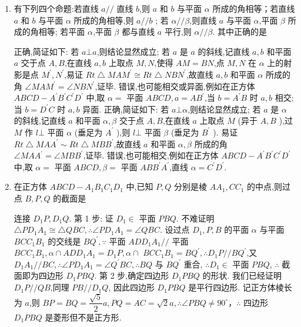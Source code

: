 \begin{enumerate}
    \item 有下列四个命题:若直线 $a//$ 直线 $b$,则 $a$ 和 $b$ 与平面 $\alpha$ 所成的角相等；若直线 $a$ 和 $b$ 与平面 $\alpha$ 所成的角相等,则 $a//b$ ; 若 $\alpha //\beta$,则直线 $a$ 与平面 $\alpha$,平面 $\beta$ 所成的角相等; 若平面 $\alpha$,平面 $\beta$ 都与直线 $a$ 平行,则 $\alpha //\beta$. 其中正确的是
    \begin{jieda}
        正确,简证如下: 若 $a\bot a$,则结论显然成立; 若 $a$ 是 $a$ 的斜线,记直线 $a,b$ 和平面 $a$ 交于点 $A,B$,在直线 $a,b$ 上取点 $M,N$,使得 ${AM} = {BN}$,点 $M,N$ 在 $\alpha$ 上的射影是点 ${M}^{\prime },{N}^{\prime }$,易证 ${{Rt}}\bigtriangleup {MA}{M}^{\prime } \cong  {{Rt}}\bigtriangleup {NB}{N}^{\prime }$,故直线 $a,b$ 和平面 $\alpha$ 所成的角 $\angle {MA}{M}^{\prime } = \angle {NB}{N}^{\prime }$,证毕. 错误,也可能相交或异面,例如在正方体 ${ABCD} - {A}^{\prime }{B}^{\prime }{C}^{\prime }{D}^{\prime }$ 中,取 $\alpha  =$ 平面 ${ABCD},a = A{B}^{\prime }$,当 $b = {A}^{\prime }B$ 时 $a,b$ 相交; 当 $b = {D}^{\prime }C$ 时 $a,b$ 异面. 正确,简证如下: 若 $a\bot \alpha$,则结论显然成立; 若 $a$ 是 $\alpha$ 的斜线,记直线 $a$ 和平面 $\alpha,\beta$ 交于点 $A,B$,在直线 $a$ 上取点 $M$ (异于 $A,B$ ),过 $M$ 作 $l \bot$ 平面 $\alpha$ (垂足为 ${A}^{\prime }$ ),则 $l \bot$ 平面 $\beta$ (垂足为 ${B}^{\prime }$ ). 易证 ${{Rt}}\bigtriangleup {MA}{A}^{\prime } \sim  {{Rt}}\bigtriangleup {MB}{B}^{\prime }$,故直线 $a$ 和平面 $\alpha,\beta$ 所成的角 $\angle {MA}{A}^{\prime } = \angle {MB}{B}^{\prime }$,证毕. 错误,也可能相交,例如在正方体 ${ABCD} - {A}^{\prime }{B}^{\prime }{C}^{\prime }{D}^{\prime }$ 中,取 $\alpha  =$ 平面 ${ABCD},\beta  =$ 平面 ${AB}{B}^{\prime }{A}^{\prime }$,直线 $\alpha  = {C}^{\prime }{D}^{\prime }$.
    \end{jieda}
    \item 在正方体 ${ABCD} - {A}_{1}{B}_{1}{C}_{1}{D}_{1}$ 中,已知 $P,Q$ 分别是棱 $A{A}_{1},C{C}_{1}$ 的中点,则过点 $B,P,Q$ 的截面是
    \begin{jieda}
        连接 ${D}_{1}P,{D}_{1}Q$. 第 1 步: 证 ${D}_{1} \in$ 平面 ${PBQ}$. 不难证明 $\bigtriangleup P{D}_{1}{A}_{1} \cong  \bigtriangleup {QBC},\therefore \angle P{D}_{1}{A}_{1} = \angle {QBC}$. 设过点 ${D}_{1},P,B$ 的平面 $\alpha$ 与平面 ${BC}{C}_{1}{B}_{1}$ 的交线是 $B{Q}^{\prime },\because$ 平面 ${AD}{D}_{1}{A}_{1}//$ 平面 ${BC}{C}_{1}{B}_{1},\alpha  \cap  {AD}{D}_{1}{A}_{1} = {D}_{1}P,\alpha  \cap$  ${BC}{C}_{1}{B}_{1} = B{Q}^{\prime },\therefore {D}_{1}P//B{Q}^{\prime }$,又 ${D}_{1}{A}_{1}//{BC},\therefore \angle P{D}_{1}{A}_{1} = \angle {Q}^{\prime }{BC},\therefore {BQ}$ 与 $B{Q}^{\prime }$ 重合, $\therefore {D}_{1} \in$ 平面 ${PBQ}$, $\therefore$ 截面即为四边形 ${D}_{1}{PBQ}$. 第 2 步,确定四边形 ${D}_{1}{PBQ}$ 的形状. 我们已经证明 ${D}_{1}P//{QB}$,同理 ${PB}//{D}_{1}Q$, 因此四边形 ${D}_{1}{PBQ}$ 是平行四边形. 记正方体棱长为 $a$,则 ${BP} = {BQ} = \dfrac{\sqrt{5}}{2}a,{PQ} = {AC} = \sqrt{2}a,\therefore \angle {PBQ} \neq  {90}^{ \circ  }$，$\therefore$ 四边形 ${D}_{1}{PBQ}$ 是菱形但不是正方形.

\end{jieda}
\end{enumerate}
